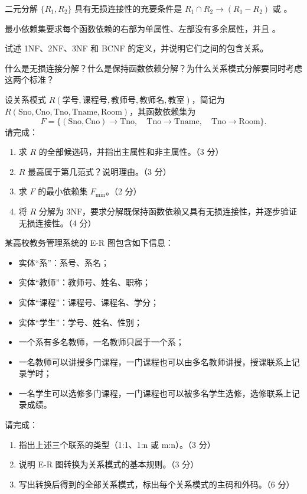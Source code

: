 \documentclass[a4paper,11pt]{article}
\begin{document}
\q 二元分解 $\{R_1,R_2\}$ 具有无损连接性的充要条件是 $R_1\cap R_2\to(R_1-R_2)$ 或 \fillblank{}。

\q 最小依赖集要求每个函数依赖的右部为单属性、左部没有多余属性，并且 \fillblank{}。

\q 试述 1NF、2NF、3NF 和 BCNF 的定义，并说明它们之间的包含关系。\anslines{2.2cm}

\q 什么是无损连接分解？什么是保持函数依赖分解？为什么关系模式分解要同时考虑这两个标准？\anslines{2.2cm}

\q 设关系模式 $R(\text{学号},\text{课程号},\text{教师号},\text{教师名},\text{教室})$，简记为 $R(\text{Sno},\text{Cno},\text{Tno},\text{Tname},\text{Room})$，其函数依赖集为
\[
F=\{(\text{Sno},\text{Cno})\to\text{Tno},\quad \text{Tno}\to\text{Tname},\quad \text{Tno}\to\text{Room}\}.
\]
请完成：
\begin{enumerate}[label=（\arabic*）, leftmargin=2.4em, itemsep=1pt]
  \item 求 $R$ 的全部候选码，并指出主属性和非主属性。（3 分）
  \item $R$ 最高属于第几范式？说明理由。（3 分）
  \item 求 $F$ 的最小依赖集 $F_{\min}$。（2 分）
  \item 将 $R$ 分解为 3NF，要求分解既保持函数依赖又具有无损连接性，并逐步验证无损连接性。（4 分）
\end{enumerate}
\anslines{4.5cm}

\q 某高校教务管理系统的 E-R 图包含如下信息：
\begin{itemize}[leftmargin=1.6em, itemsep=1pt]
  \item 实体“系”：系号、系名；
  \item 实体“教师”：教师号、姓名、职称；
  \item 实体“课程”：课程号、课程名、学分；
  \item 实体“学生”：学号、姓名、性别；
  \item 一个系有多名教师，一名教师只属于一个系；
  \item 一名教师可以讲授多门课程，一门课程也可以由多名教师讲授，授课联系上记录学时；
  \item 一名学生可以选修多门课程，一门课程也可以被多名学生选修，选修联系上记录成绩。
\end{itemize}

请完成：
\begin{enumerate}[label=（\arabic*）, leftmargin=2.4em, itemsep=1pt]
  \item 指出上述三个联系的类型（1:1、1:n 或 m:n）。（3 分）
  \item 说明 E-R 图转换为关系模式的基本规则。（3 分）
  \item 写出转换后得到的全部关系模式，标出每个关系模式的主码和外码。（6 分）
\end{enumerate}
\anslines{4.5cm}
\end{document}
